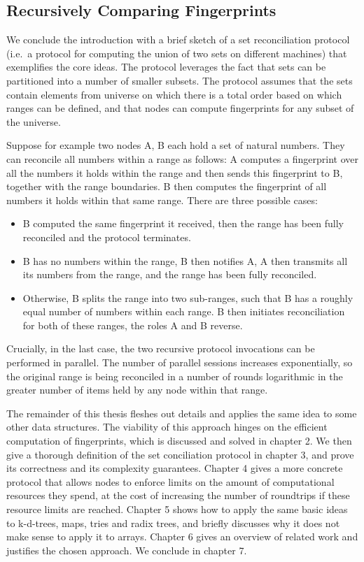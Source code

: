 \documentclass{article}
\begin{document}
\subsection{Recursively Comparing
Fingerprints}\label{recursively-comparing-fingerprints}

We conclude the introduction with a brief sketch of a set reconciliation
protocol (i.e.~a protocol for computing the union of two sets on
different machines) that exemplifies the core ideas. The protocol
leverages the fact that sets can be partitioned into a number of smaller
subsets. The protocol assumes that the sets contain elements from
universe on which there is a total order based on which ranges can be
defined, and that nodes can compute fingerprints for any subset of the
universe.

Suppose for example two nodes A, B each hold a set of natural numbers.
They can reconcile all numbers within a range as follows: A computes
a fingerprint over all the numbers it holds within the range and then sends this
fingerprint to B, together with the range boundaries. B then computes
the fingerprint of all numbers it holds within that same range. There
are three possible cases:

\begin{itemize}
\item
  B computed the same fingerprint it received, then the range has
  been fully reconciled and the protocol terminates.
\item
  B has no numbers within the range, B then notifies A, A then
  transmits all its numbers from the range, and the range has been
  fully reconciled.
\item
  Otherwise, B splits the range into two sub-ranges, such that B
  has a roughly equal number of numbers within each range. B then
  initiates reconciliation for both of these ranges, the roles A and
  B reverse.
\end{itemize}

Crucially, in the last case, the two recursive protocol invocations can
be performed in parallel. The number of parallel sessions increases
exponentially, so the original range is being reconciled in a number
of rounds logarithmic in the greater number of items held by any node
within that range.

The remainder of this thesis fleshes out details and applies the same
idea to some other data structures. The viability of this approach
hinges on the efficient computation of fingerprints, which is discussed
and solved in chapter 2. We then give a thorough definition of the set
conciliation protocol in chapter 3, and prove its correctness and its
complexity guarantees. Chapter 4 gives a more concrete protocol that
allows nodes to enforce limits on the amount of computational resources
they spend, at the cost of increasing the number of roundtrips if these
resource limits are reached. Chapter 5 shows how to apply the same basic
ideas to k-d-trees, maps, tries and radix trees, and briefly discusses
why it does not make sense to apply it to arrays. Chapter 6
gives an overview of related work and justifies the chosen approach. We
conclude in chapter 7.
\end{document}

